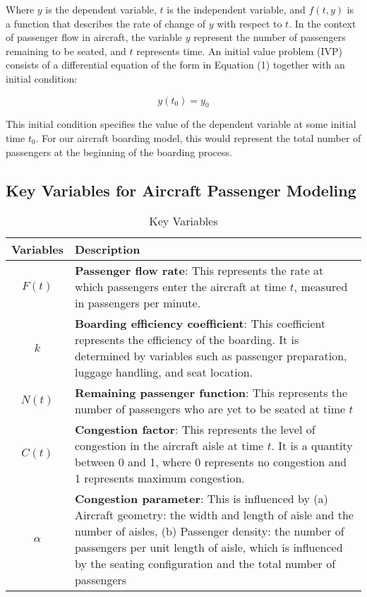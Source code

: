 \documentclass[12pt]{article}
\begin{document}
Where $y$ is the dependent variable, $t$ is the independent variable, and $f(t, y)$ is a function that describes the rate of change of $y$ with respect to $t$. In the context of passenger flow in aircraft, the variable $y$ represent the number of passengers remaining to be seated, and $t$ represents time. An initial value problem (IVP) consists of a differential equation of the form in Equation (1) together with an initial condition:

\begin{equation}
y(t_0) = y_0
\end{equation}

This initial condition specifies the value of the dependent variable at some initial time $t_0$. For our aircraft boarding model, this would represent the total number of passengers at the beginning of the boarding process.

\subsection{Key Variables for Aircraft Passenger Modeling}

\begin{table}[H]
\centering
\caption{Key Variables}
\begin{tabular}{cp{12cm}}
\toprule
\textbf{Variables} & \textbf{Description} \\
\midrule
$F(t)$ & \textbf{Passenger flow rate}: This represents the rate at which passengers enter the aircraft at time $t$, measured in passengers per minute. \\
\midrule
$k$ & \textbf{Boarding efficiency coefficient}: This coefficient represents the efficiency of the boarding. It is determined by variables such as passenger preparation, luggage handling, and seat location. \\
\midrule
$N(t)$ & \textbf{Remaining passenger function}: This represents the number of passengers who are yet to be seated at time $t$ \\
\midrule
$C(t)$ & \textbf{Congestion factor}: This represents the level of congestion in the aircraft aisle at time $t$. It is a quantity between 0 and 1, where 0 represents no congestion and 1 represents maximum congestion. \\
\midrule
$\alpha$ & \textbf{Congestion parameter}: This is influenced by (a) Aircraft geometry: the width and length of aisle and the number of aisles, (b) Passenger density: the number of passengers per unit length of aisle, which is influenced by the seating configuration and the total number of passengers \\
\bottomrule
\end{tabular}
\end{table}
\end{document}
